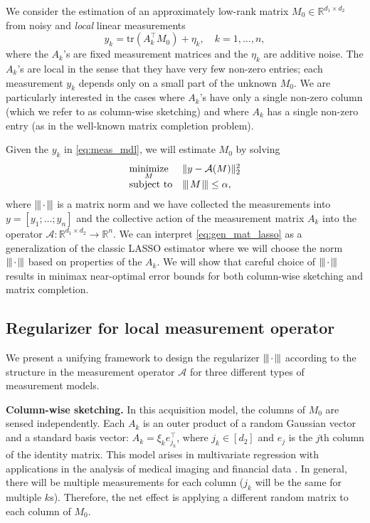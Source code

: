 \documentclass[11pt]{article}
\newcommand{\xspace}{\hbox{\kern-2.5pt}}
\newcommand\tnorm[1]{\left\vert\xspace\left\vert\xspace\left\vert\mskip2mu
#1\mskip2mu \right\vert\xspace\right\vert\xspace\right\vert}
\begin{document}
We consider the estimation of an approximately low-rank matrix $M_0 \in \mathbb{R}^{d_1 \times d_2}$ from noisy and \emph{local} linear measurements 
\begin{equation}
	\label{eq:meas_mdl}
	y_k = \mathrm{tr}(A_k^\top M_0) + \eta_k, \quad k=1,\dots,n,
\end{equation}
where the $A_k$'s are fixed measurement matrices and the $\eta_k$ are additive noise.  The $A_k$'s are local in the sense that they have very few non-zero entries; each measurement $y_k$ depends only on a small part of the unknown $M_0$.  We are particularly interested in the cases where $A_k$'s have only a single non-zero column (which we refer to as column-wise sketching) and where $A_k$ has a single non-zero entry (as in the well-known matrix completion problem).

Given the $y_k$ in \eqref{eq:meas_mdl}, we will estimate $M_0$ by solving
\begin{equation}
	\label{eq:gen_mat_lasso}
	\begin{array}{ll}
		\displaystyle \mathop{\text{minimize}}_M & \|y - \mathcal{A}(M)\|_2^2 \\
		\text{subject to} & \tnorm{M} \leq \alpha,
	\end{array}
\end{equation}
where $\tnorm{\cdot}$ is a matrix norm and we have collected the measurements into $y = [y_1 ; \dots ; y_n]$ and the collective action of the measurement matrix $A_k$ into the operator $\mathcal{A}: \mathbb{R}^{d_1 \times d_2} \to \mathbb{R}^n$. We can interpret \eqref{eq:gen_mat_lasso} as a generalization of the classic LASSO estimator \citep{tibshirani1996regression} where we will choose the norm $\tnorm{\cdot}$ based on properties of the $A_k$.  We will show that careful choice of $\tnorm{\cdot}$ results in minimax near-optimal error bounds for both column-wise sketching and matrix completion. 

\subsection{Regularizer for local measurement operator}

We present a unifying framework to design the regularizer $\tnorm{\cdot}$ according to the structure in the measurement operator $\mathcal{A}$ for three different types of measurement models.

\vspace{.1in}
\noindent
\textbf{Column-wise sketching.}
%
In this acquisition model, the columns of $M_0$ are sensed independently.  Each $A_k$ is an outer product of a random Gaussian vector and a standard basis vector: $A_k = \xi_k e_{j_k}^\top$, where $j_k \in [d_2]$ and $e_j$ is the $j$th column of the identity matrix. This model arises in multivariate regression with applications in the analysis of medical imaging and financial data \cite{negahban2011estimation}.
In general, there will be multiple measurements for each column ($j_k$ will be the same for multiple $k$s). Therefore, the net effect is applying a different random matrix to each column of $M_0$.  
\end{document}
